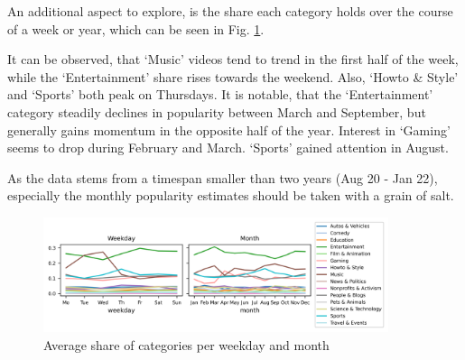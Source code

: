 \documentclass{article}
\begin{document}
An additional aspect to explore, is the share each category holds over the course of a week or year, which can be seen in Fig. \ref{fig:cat_cycle}. 

It can be observed, that `Music' videos tend to trend in the first half of the week, while the `Entertainment' share rises towards the weekend. Also, `Howto \& Style' and `Sports' both peak on Thursdays. It is notable, that the `Entertainment' category steadily declines in popularity between March and September, but generally gains momentum in the opposite half of the year. Interest in `Gaming' seems to drop during February and March. `Sports' gained attention in August. 

As the data stems from a timespan smaller than two years (Aug 20 - Jan 22), especially the monthly popularity estimates should be taken with a grain of salt.

\begin{figure}[h]
    \centering
    \includegraphics[width=0.9\textwidth]{fig/cat_weekday_month.png}
    \caption{Average share of categories per weekday and month}
    \label{fig:cat_cycle}
\end{figure}
\end{document}
